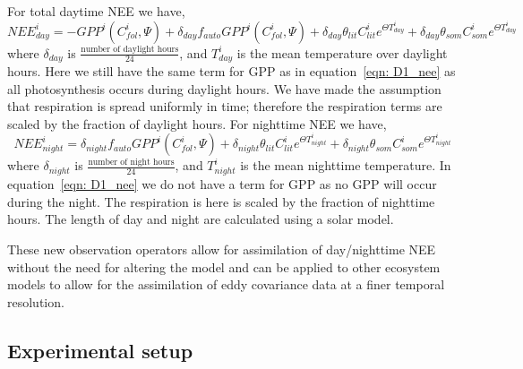 For total daytime NEE we have,
\begin{equation}
NEE_{day}^{i} = -GPP^{i}(C_{fol}^{i}, \Psi) + \delta_{day}f_{auto}GPP^{i}(C_{fol}^{i}, \Psi) + \delta_{day}\theta_{lit}C_{lit}^i e^{\Theta T_{day}^{i}} + \delta_{day}\theta_{som}C_{som}^i e^{\Theta T_{day}^{i}} \label{eqn: D1_nee_day}
\end{equation}
where \(\delta_{day}\) is \(\frac{\text{number of daylight hours}}{24}\), and \(T_{day}^{i}\) is the mean temperature over daylight hours. Here we still have the same term for GPP as in equation~\eqref{eqn: D1_nee} as all photosynthesis occurs during daylight hours. We have made the assumption that respiration is spread uniformly in time; therefore the respiration terms are scaled by the fraction of daylight hours. For nighttime NEE we have,
\begin{equation}
NEE_{night}^{i} =  \delta_{night}f_{auto}GPP^{i}(C_{fol}^{i}, \Psi) + \delta_{night}\theta_{lit}C_{lit}^i e^{\Theta T_{night}^{i}} + \delta_{night}\theta_{som}C_{som}^i e^{\Theta T_{night}^{i}} \label{eqn: D1_nee_night}
\end{equation}
where \(\delta_{night}\) is \(\frac{\text{number of night hours}}{24}\), and \(T_{night}^{i}\) is the mean nighttime temperature. In equation~\eqref{eqn: D1_nee} we do not have a term for GPP as no GPP will occur during the night. The respiration is here is scaled by the fraction of nighttime hours. The length of day and night are calculated using a solar model.

 These new observation operators allow for assimilation of day/nighttime NEE without the need for altering the model and can be applied to other ecosystem models to allow for the assimilation of eddy covariance data at a finer temporal resolution. 

\subsection{Experimental setup}


